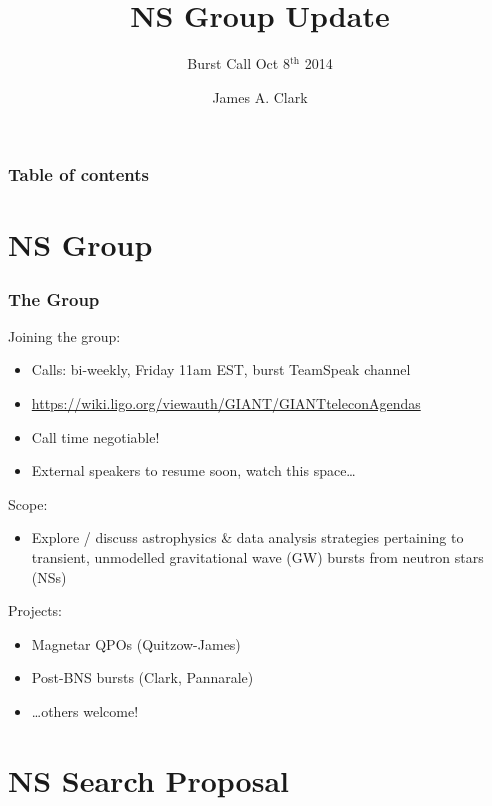 \documentclass{beamer}
\def\gw#1{gravitational wave#1 (GW#1)\gdef\gw{GW}}
\def\ns#1{neutron star#1 (NS#1)\gdef\ns{NS}}
\begin{document}
\title{NS Group Update}
\subtitle{Burst Call Oct 8$^{\text{th}}$ 2014}  
\author{James A. Clark}
\date{} 

\begin{frame}[plain]
\titlepage
\end{frame}

\begin{frame}\frametitle{Table of contents}\tableofcontents
\end{frame} 

\section{NS Group}

\begin{frame}
    \frametitle{The Group}
    Joining the group:
    \begin{itemize}
        \item Calls: bi-weekly, Friday 11am EST, burst TeamSpeak channel
        \item
            {\small\href{https://wiki.ligo.org/viewauth/GIANT/GIANTteleconAgendas}
            {https://wiki.ligo.org/viewauth/GIANT/GIANTteleconAgendas}}
        \item Call time negotiable!
        \item External speakers to resume soon, watch this space\dots
    \end{itemize}
    Scope:
    \begin{itemize}
        \item Explore / discuss astrophysics \& data analysis strategies
            pertaining to transient, unmodelled \gw{} bursts from \ns{s}
    \end{itemize}
    Projects:
    \begin{itemize}
        \item Magnetar QPOs (Quitzow-James)
        \item Post-BNS bursts (Clark, Pannarale)
        \item \dots others welcome!
    \end{itemize}
\end{frame}

\section{NS Search Proposal}
\end{document}
